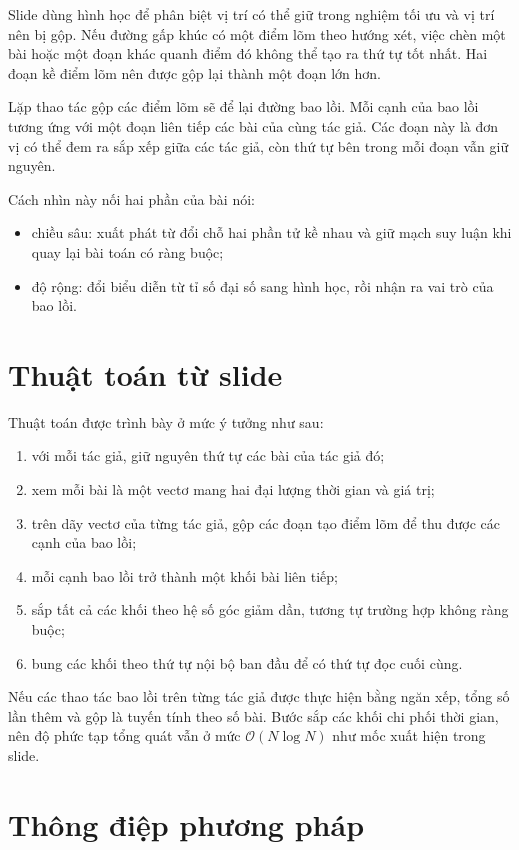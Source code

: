 \documentclass[11pt]{article}
\newcommand{\Oh}{\mathcal{O}}
\begin{document}
Slide dùng hình học để phân biệt vị trí có thể giữ trong nghiệm tối ưu và vị
trí nên bị gộp. Nếu đường gấp khúc có một điểm lõm theo hướng xét, việc chèn
một bài hoặc một đoạn khác quanh điểm đó không thể tạo ra thứ tự tốt nhất.
Hai đoạn kề điểm lõm nên được gộp lại thành một đoạn lớn hơn.

Lặp thao tác gộp các điểm lõm sẽ để lại đường bao lồi. Mỗi cạnh của bao lồi
tương ứng với một đoạn liên tiếp các bài của cùng tác giả. Các đoạn này là
đơn vị có thể đem ra sắp xếp giữa các tác giả, còn thứ tự bên trong mỗi đoạn
vẫn giữ nguyên.

Cách nhìn này nối hai phần của bài nói:
\begin{itemize}
  \item chiều sâu: xuất phát từ đổi chỗ hai phần tử kề nhau và giữ mạch suy
  luận khi quay lại bài toán có ràng buộc;
  \item độ rộng: đổi biểu diễn từ tỉ số đại số sang hình học, rồi nhận ra vai
  trò của bao lồi.
\end{itemize}

\section{Thuật toán từ slide}

Thuật toán được trình bày ở mức ý tưởng như sau:
\begin{enumerate}
  \item với mỗi tác giả, giữ nguyên thứ tự các bài của tác giả đó;
  \item xem mỗi bài là một vectơ mang hai đại lượng thời gian và giá trị;
  \item trên dãy vectơ của từng tác giả, gộp các đoạn tạo điểm lõm để thu được
  các cạnh của bao lồi;
  \item mỗi cạnh bao lồi trở thành một khối bài liên tiếp;
  \item sắp tất cả các khối theo hệ số góc giảm dần, tương tự trường hợp
  không ràng buộc;
  \item bung các khối theo thứ tự nội bộ ban đầu để có thứ tự đọc cuối cùng.
\end{enumerate}

Nếu các thao tác bao lồi trên từng tác giả được thực hiện bằng ngăn xếp, tổng
số lần thêm và gộp là tuyến tính theo số bài. Bước sắp các khối chi phối thời
gian, nên độ phức tạp tổng quát vẫn ở mức \(\Oh(N\log N)\) như mốc xuất hiện
trong slide.

\section{Thông điệp phương pháp}
\end{document}
